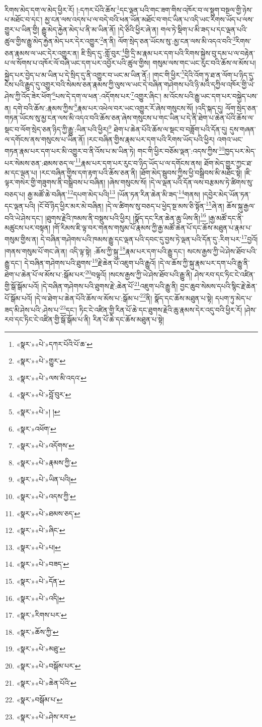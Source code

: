 རིགས་མེད་དག་ལ་མེད་ཕྱིར་རོ། །:དཀར་པོའི་ཆོས་\footnote{«སྣར་»«པེ་»དཀར་པོའི་པོ་ཆ་}དང་ལྡན་པའི་གང་ཟག་གིས་འཁོར་བ་ལ་སྡུག་བསྔལ་གྱི་ཉེས་པ་མཐོང་བ་དང་། མྱ་ངན་ལས་འདས་པ་ལ་བདེ་བའི་ཕན་ཡོན་མཐོང་བ་གང་ཡིན་པ་འདི་ཡང་རིགས་ཡོད་པ་ལས་གྱུར་པ་ཡིན་གྱི། རྒྱུ་མེད་རྐྱེན་མེད་པ་ནི་མ་ཡིན་ནོ། །དེ་ཅིའི་ཕྱིར་ཞེ་ན། གལ་ཏེ་སྡིག་པ་མི་ཟད་པ་དང་ལྡན་པའི་ཚུལ་གྱིས་རྒྱུ་མེད་རྐྱེན་མེད་པར་དེར་འགྱུར་\footnote{«སྣར་»«པེ་»གྱུར་}ན་ནི། ལོག་སྲེད་ཅན་ཡོངས་སུ་:མྱ་ངན་ལས་མི་འདའ་བའི་\footnote{«སྣར་»«པེ་»ལས་མི་འདའ་}རིགས་ཅན་རྣམས་ལ་ཡང་དེར་འགྱུར་ན། ཇི་སྲིད་དུ་:གློ་བུར་\footnote{«སྣར་»«པེ་»བློ་བུར་}གྱི་དྲི་མ་རྣམ་པར་དག་པའི་རིགས་སྐྱེས་བུ་དམ་པ་ལ་བརྟེན་པ་ལ་སོགས་པ་འཁོར་ལོ་བཞི་ཡང་དག་པར་འབྱོར་པའི་ཚུལ་གྱིས། གསུམ་ལས་གང་ཡང་རུང་བའི་ཆོས་ལ་མོས་པ། སྐྱེད་པར་བྱེད་པ་མ་ཡིན་པ་དེ་སྲིད་དུ་ནི་འགྱུར་བ་ཡང་མ་ཡིན་ནོ:། །གང་གི་ཕྱིར་\footnote{«སྣར་»«པེ་»། །}དེའི་འོག་ཏུ་ཐ་ན་ལོག་པ་ཉིད་དུ་ངེས་པའི་རྒྱུད་དུ་འགྱུར་བའི་སེམས་ཅན་རྣམས་ཀྱི་ལུས་ལ་ཡང་དེ་བཞིན་གཤེགས་པའི་ཉི་མའི་དཀྱིལ་འཁོར་གྱི་ཡེ་ཤེས་ཀྱི་འོད་ཟེར་ཕོག་\footnote{«སྣར་»འཕོག་}པས་དེ་དག་ལ་ཕན་:འདོགས་པར་\footnote{«སྣར་»«པེ་»འདོགས་}འགྱུར་ཞིང་། མ་འོངས་པའི་རྒྱུ་ཡང་དག་པར་བསྐྱེད་པས་ན། དགེ་བའི་ཆོས་:རྣམས་ཀྱིས་\footnote{«སྣར་»«པེ་»རྣམས་ཀྱི་}རྣམ་པར་འཕེལ་བར་ཡང་འགྱུར་རོ་ཞེས་གསུངས་སོ། །འདི་སྐད་དུ། ལོག་སྲེད་ཅན་གཏན་ཡོངས་སུ་མྱ་ངན་ལས་མི་འདའ་བའི་ཆོས་ཅན་ཞེས་གསུངས་པ་གང་ཡིན་པ་དེ་ནི་ཐེག་པ་ཆེན་པོའི་ཆོས་ལ་སྡང་བ་ལོག་སྲེད་ཅན་ཉིད་ཀྱི་རྒྱུ་:ཡིན་པའི་ཕྱིར།\footnote{«སྣར་»«པེ་»ཡིན་པའི།} ཐེག་པ་ཆེན་པོའི་ཆོས་ལ་སྡང་བ་བཟློག་པའི་དོན་དུ། དུས་གཞན་ལ་དགོངས་ནས་གསུངས་པ་ཡིན་ནོ། །རང་བཞིན་གྱིས་རྣམ་པར་དག་པའི་རིགས་ཡོད་པའི་ཕྱིར། འགའ་ཡང་གཏན་རྣམ་པར་དག་པར་མི་འགྱུར་བ་ནི་འོས་པ་མ་ཡིན་ཏེ། གང་གི་ཕྱིར་བཅོམ་ལྡན་:འདས་ཀྱིས་\footnote{«སྣར་»«པེ་»འདས་ཀྱི་}ཁྱད་པར་མེད་པར་སེམས་ཅན་:ཐམས་ཅད་ལ་\footnote{«སྣར་»«པེ་»ཐམས་ཅད་}རྣམ་པར་དག་པར་རུང་བ་ཉིད་ཡོད་པ་ལ་དགོངས་ནས། ཐོག་མེད་གྱུར་ཀྱང་ཐ་མ་དང་ལྡན་པ། །རང་བཞིན་གྱིས་དག་རྟག་པའི་ཆོས་ཅན་ནི། །ཐོག་མེད་སྦུབས་ཀྱིས་ཕྱི་བསྒྲིབས་མི་མཐོང་སྟེ། །ཇི་ལྟར་གསེར་གྱི་གཟུགས་ནི་བསྒྲིབས་པ་བཞིན། །ཞེས་གསུངས་སོ། །དེ་ལ་ལྡན་པའི་དོན་ལས་བརྩམས་ཏེ་ཚིགས་སུ་བཅད་པ། རྒྱ་མཚོ་ཆེ་བཞིན་\footnote{«སྣར་»«པེ་»ཞིང་}དཔག་མེད་པའི།\footnote{«སྣར་»«པེ་»པ།} །ཡོན་ཏན་རིན་ཆེན་མི་ཟད་\footnote{«སྣར་»«པེ་»བཟད་}གནས། །དབྱེར་མེད་ཡོན་ཏན་དང་ལྡན་པའི། །ངོ་བོ་ཉིད་ཕྱིར་མར་མེ་བཞིན། །དེ་ལ་ཚིགས་སུ་བཅད་པ་ཕྱེད་སྔ་མས་ཅི་སྟོན་\footnote{«སྣར་»«པེ་»དོན་}ཞེ་ན། ཆོས་སྐུ་རྒྱལ་བའི་ཡེ་ཤེས་དང་། །ཐུགས་རྗེའི་ཁམས་ནི་བསྡུས་པའི་ཕྱིར། །སྣོད་དང་རིན་ཆེན་ཆུ་ཡིས་ནི།\footnote{«སྣར་»«པེ་»འདི།} །རྒྱ་མཚོ་དང་ནི་མཚུངས་པར་བསྟན། །གོ་རིམས་ཇི་ལྟ་བར་གནས་གསུམ་པོ་རྣམས་ཀྱི་རྒྱ་མཚོ་ཆེན་པོ་དང་ཆོས་མཐུན་པ་རྣམ་པ་གསུམ་གྱིས་ན། དེ་བཞིན་གཤེགས་པའི་ཁམས་རྒྱུ་དང་ལྡན་པའི་དབང་དུ་བྱས་ཏེ་ལྡན་པའི་དོན་དུ་:རིག་པར་\footnote{«སྣར་»རིགས་པར་}བྱའོ། །གནས་གསུམ་པོ་གང་ཞེ་ན། འདི་ལྟ་སྟེ། :ཆོས་ཀྱི་སྐུ་\footnote{«སྣར་»ཆོས་ཀྱི་}རྣམ་པར་དག་པའི་རྒྱུ་དང་། སངས་རྒྱས་ཀྱི་ཡེ་ཤེས་ཐོབ་པའི་རྒྱུ་དང་། དེ་བཞིན་གཤེགས་པའི་ཐུགས་\footnote{«སྣར་»«པེ་»མཐུ་}རྗེ་ཆེན་པོ་འཇུག་པའི་རྒྱུའོ། །དེ་ལ་ཆོས་ཀྱི་སྐུ་རྣམ་པར་དག་པའི་རྒྱུ་ནི་ཐེག་པ་ཆེན་པོ་ལ་མོས་པ་:སྒོམ་པར་\footnote{«སྣར་»«པེ་»བསྒོམ་པར་}བལྟའོ། །སངས་རྒྱས་ཀྱི་ཡེ་ཤེས་ཐོབ་པའི་རྒྱུ་ནི། ཤེས་རབ་དང་ཏིང་ངེ་འཛིན་གྱི་སྒོ་སྒོམ་པའོ། །དེ་བཞིན་གཤེགས་པའི་ཐུགས་རྗེ་:ཆེན་པོ་\footnote{«སྣར་»«པེ་»ཆེན་པོའི་}འཇུག་པའི་རྒྱུ་ནི། བྱང་ཆུབ་སེམས་དཔའི་སྙིང་རྗེ་ཆེན་པོ་སྒོམ་པའོ། །དེ་ལ་ཐེག་པ་ཆེན་པོའི་ཆོས་ལ་མོས་པ་:སྒོམ་པ་\footnote{«སྣར་»བསྒོམ་པ་}ནི། སྣོད་དང་ཆོས་མཐུན་པ་སྟེ། དཔག་ཏུ་མེད་པ་ཟད་མི་ཤེས་པའི་:ཤེས་པ་\footnote{«སྣར་»«པེ་»ཤེས་རབ་}དང་། ཏིང་ངེ་འཛིན་གྱི་རིན་པོ་ཆེ་དང་ཐུགས་རྗེའི་ཆུ་རྣམས་དེར་འདུ་བའི་ཕྱིར་རོ། །ཤེས་རབ་དང་ཏིང་ངེ་འཛིན་གྱི་སྒོ་སྒོམ་པ་ནི། རིན་པོ་ཆེ་དང་ཆོས་མཐུན་པ་སྟེ། 